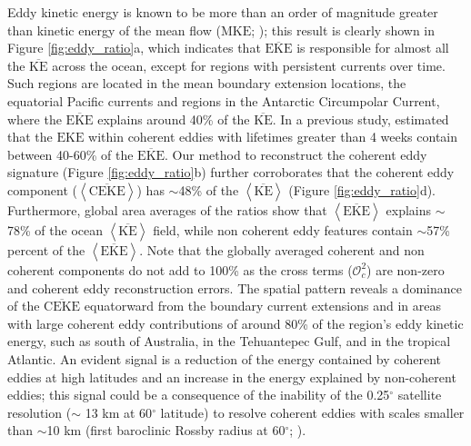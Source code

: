 \documentclass[draft,linenumbers]{agujournal2019}
\newcommand{\MKE}{\overline{\textrm{KE}}}
\newcommand{\mKE}{\textrm{MKE}}
\newcommand{\MEKE}{\overline{\textrm{EKE}}}
\newcommand{\EKE}{\textrm{EKE}}
\newcommand{\MCEKE}{\overline{\textrm{CEKE}}}
\begin{document}
	Eddy kinetic energy is known to be more than an order of magnitude greater than kinetic energy of the mean flow ($\mKE$; \citealp{Gill_Energy_1974}); this result is clearly shown in Figure \ref{fig:eddy_ratio}a, which indicates that $\MEKE$ is responsible for almost all the $\MKE$ across the ocean, except for regions with persistent currents over time. 
	Such regions are located in the mean boundary extension locations, the equatorial Pacific currents and regions in the Antarctic Circumpolar Current, where the $\MEKE$ explains around 40\% of the $\MKE$. 
	In a previous study, \citet{Chelton_The_2011} estimated that the $\EKE$ within coherent eddies with lifetimes greater than 4 weeks contain between 40-60\% of the $\MEKE$. 
	Our method to reconstruct the coherent eddy signature (Figure \ref{fig:eddy_ratio}b) further corroborates that the coherent eddy component ($\left<\MCEKE\right>$) has $\sim$48\% of the $\left<\MKE\right>$ (Figure \ref{fig:eddy_ratio}d). 
	Furthermore, global area averages of the ratios show that $\left<\MEKE\right>$ explains $\sim$78\% of the ocean $\left<\MKE\right>$ field, while non coherent eddy features contain $\sim$57\% percent of the $\left<\MEKE\right>$. 
	Note that the globally averaged coherent and non coherent components do not add to 100\% as the cross terms ($\mathcal{O}_c^2$) are non-zero and coherent eddy reconstruction errors.
	The spatial pattern reveals a dominance of the $\MCEKE$ equatorward from the boundary current extensions and in areas with large coherent eddy contributions of around 80\% of the region's eddy kinetic energy, such as south of Australia, in the Tehuantepec Gulf, and in the tropical Atlantic. 
	An evident signal is a reduction of the energy contained by coherent eddies at high latitudes and an increase in the energy explained by non-coherent eddies; this signal could be a consequence of the inability of the 0.25$^\circ$ satellite resolution ($\sim$ 13 km at 60$^\circ$ latitude) to resolve coherent eddies with scales smaller than $\sim$10 km (first baroclinic Rossby radius at 60$^\circ$; \citealp{Chelton_Geographical_1998}).

\end{document}
